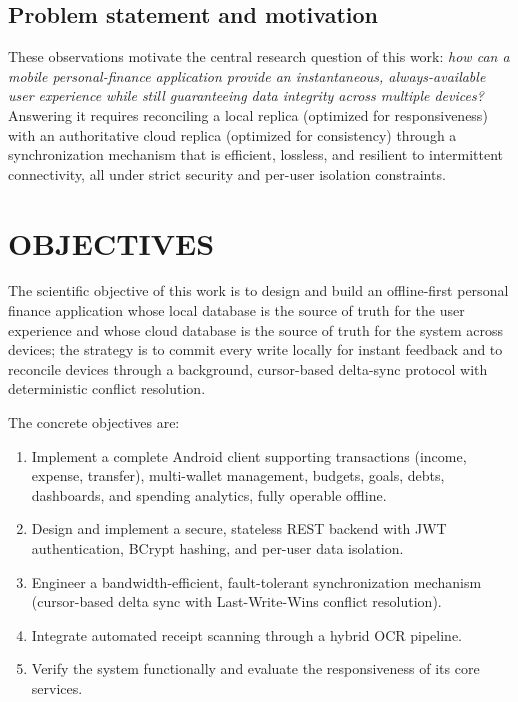\documentclass[13pt,a4paper]{extarticle}
\begin{document}
\subsection{Problem statement and motivation}
These observations motivate the central research question of this work: \emph{how can a mobile
personal-finance application provide an instantaneous, always-available user experience while still
guaranteeing data integrity across multiple devices?} Answering it requires reconciling a local
replica (optimized for responsiveness) with an authoritative cloud replica (optimized for
consistency) through a synchronization mechanism that is efficient, lossless, and resilient to
intermittent connectivity, all under strict security and per-user isolation constraints.

\section{OBJECTIVES}

The scientific objective of this work is to design and build an offline-first personal finance
application whose local database is the source of truth for the user experience and whose cloud
database is the source of truth for the system across devices; the strategy is to commit every
write locally for instant feedback and to reconcile devices through a background, cursor-based
delta-sync protocol with deterministic conflict resolution.

\noindent The concrete objectives are:
\begin{enumerate}[leftmargin=2em,itemsep=2pt]
  \item Implement a complete Android client supporting transactions (income, expense, transfer),
        multi-wallet management, budgets, goals, debts, dashboards, and spending analytics, fully
        operable offline.
  \item Design and implement a secure, stateless REST backend with JWT authentication, BCrypt
        hashing, and per-user data isolation.
  \item Engineer a bandwidth-efficient, fault-tolerant synchronization mechanism (cursor-based
        delta sync with Last-Write-Wins conflict resolution).
  \item Integrate automated receipt scanning through a hybrid OCR pipeline.
  \item Verify the system functionally and evaluate the responsiveness of its core services.
\end{enumerate}
\end{document}
